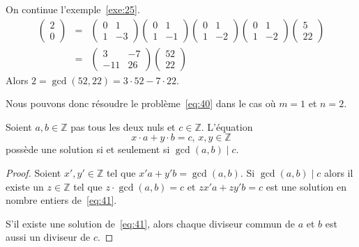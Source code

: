 \begin{example}
  \label{exe:26}
  On continue l'exemple~\ref{exe:25}.
  \begin{eqnarray*} 
    \begin{pmatrix}
      2 \\ 0
    \end{pmatrix} & = & 
    \begin{pmatrix}
      0 &1 \\
      1 & -3
    \end{pmatrix}
    \begin{pmatrix}
      0 &1 \\
      1 & -1
    \end{pmatrix}
    \begin{pmatrix}
      0 &1 \\
      1 & -2
    \end{pmatrix}
    \begin{pmatrix}
      0 &1 \\
      1 & -2
    \end{pmatrix}
    \begin{pmatrix}
     5 \\ 22
    \end{pmatrix} \\
   &  = & 
  \begin{pmatrix}
    3 & -7 \\
    -11 & 26 
  \end{pmatrix}
  \begin{pmatrix}
    52 \\22
  \end{pmatrix}
  \end{eqnarray*}
  Alors $2 = \gcd(52,22) = 3 ⋅52 -7 ⋅22$. 
\end{example}

Nous pouvons donc résoudre le problème~\eqref{eq:40} dans le cas où $m=1$ et $n=2$.

\begin{theorem}
  \label{thr:49}
  Soient $a,b ∈ℤ$ pas tous les deux nuls et $c ∈ℤ$. L'équation
  \begin{equation}
    \label{eq:41}
    x ⋅a + y ⋅b = c, \, x,y ∈ℤ
  \end{equation}
  possède une solution si et seulement si $\gcd(a,b) \mid c$. 
\end{theorem}
\begin{proof}
  Soient $x',y' ∈ℤ$ tel que $x' a + y'b = \gcd(a,b)$. Si $\gcd(a,b) \mid c$ alors il existe un $z ∈ℤ$ tel que $z ⋅\gcd(a,b) = c$ et $z x' a + z y'b = c$ est une solution en nombre entiers de~\eqref{eq:41}.

  S'il existe une solution de~\eqref{eq:41}, alors chaque diviseur commun de $a$ et $b$ est aussi un diviseur de $c$. 
\end{proof}

